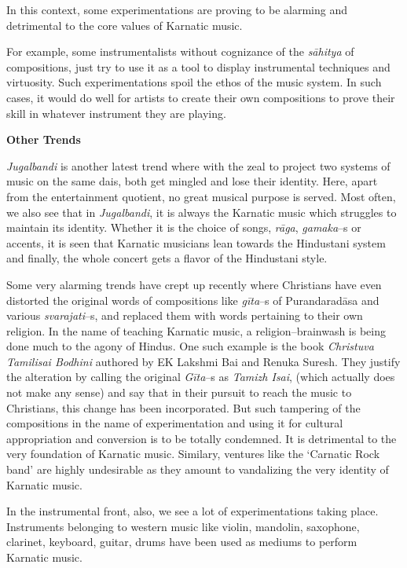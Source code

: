 In this context, some experimentations are proving to be alarming and detrimental to the core values of Karnatic music.

For example, some instrumentalists without cognizance of the \textit{sāhitya} of compositions, just try to use it as a tool to display instrumental techniques and virtuosity. Such experimentations spoil the ethos of the music system. In such cases, it would do well for artists to create their own compositions to prove their skill in whatever instrument they are playing.

\textbf{Other Trends}

\textit{Jugalbandi} is another latest trend where with the zeal to project two systems of music on the same dais, both get mingled and lose their identity. Here, apart from the entertainment quotient, no great musical purpose is served. Most often, we also see that in \textit{Jugalbandi}, it is always the Karnatic music which struggles to maintain its identity. Whether it is the choice of songs, \textit{rāga}, \textit{gamaka}–s or accents, it is seen that Karnatic musicians lean towards the Hindustani system and finally, the whole concert gets a flavor of the Hindustani style.

Some very alarming trends have crept up recently where Christians have even distorted the original words of compositions like \textit{gīta}–s of Purandaradāsa and various \textit{svarajati}–s, and replaced them with words pertaining to their own religion. In the name of teaching Karnatic music, a religion–brainwash is being done much to the agony of Hindus. One such example is the book \textit{Christuva Tamilisai Bodhini} authored by EK Lakshmi Bai and Renuka Suresh. They justify the alteration by calling the original \textit{Gīta}–s as \textit{Tamizh Isai}, (which actually does not make any sense) and say that in their pursuit to reach the music to Christians, this change has been incorporated. But such tampering of the compositions in the name of experimentation and using it for cultural appropriation and conversion is to be totally condemned. It is detrimental to the very foundation of Karnatic music. Similary, ventures like the ‘Carnatic Rock band’ are highly undesirable as they amount to vandalizing the very identity of Karnatic music.

In the instrumental front, also, we see a lot of experimentations taking place. Instruments belonging to western music like violin, mandolin, saxophone, clarinet, keyboard, guitar, drums have been used as mediums to perform Karnatic music.

